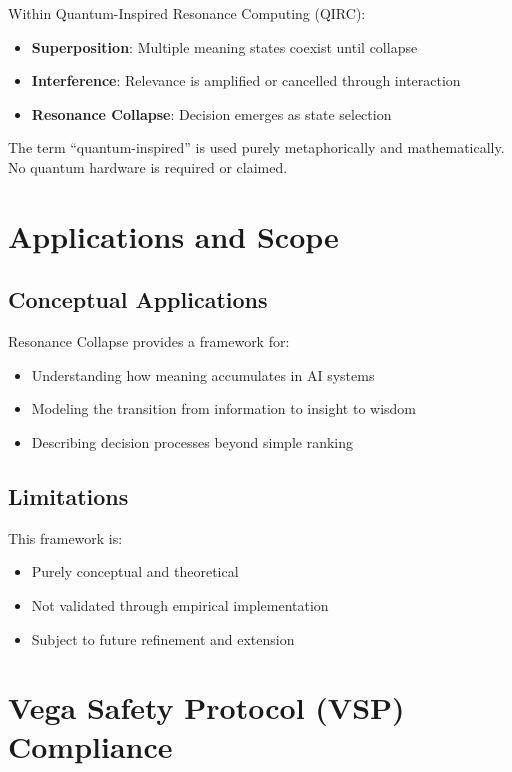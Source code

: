 \documentclass[12pt,a4paper]{article}
\begin{document}
Within Quantum-Inspired Resonance Computing (QIRC):
\begin{itemize}
    \item \textbf{Superposition}: Multiple meaning states coexist until collapse
    \item \textbf{Interference}: Relevance is amplified or cancelled through interaction
    \item \textbf{Resonance Collapse}: Decision emerges as state selection
\end{itemize}

The term ``quantum-inspired'' is used purely metaphorically and mathematically.
No quantum hardware is required or claimed.

\section{Applications and Scope}

\subsection{Conceptual Applications}

Resonance Collapse provides a framework for:
\begin{itemize}
    \item Understanding how meaning accumulates in AI systems
    \item Modeling the transition from information to insight to wisdom
    \item Describing decision processes beyond simple ranking
\end{itemize}

\subsection{Limitations}

This framework is:
\begin{itemize}
    \item Purely conceptual and theoretical
    \item Not validated through empirical implementation
    \item Subject to future refinement and extension
\end{itemize}

\section{Vega Safety Protocol (VSP) Compliance}
\end{document}
